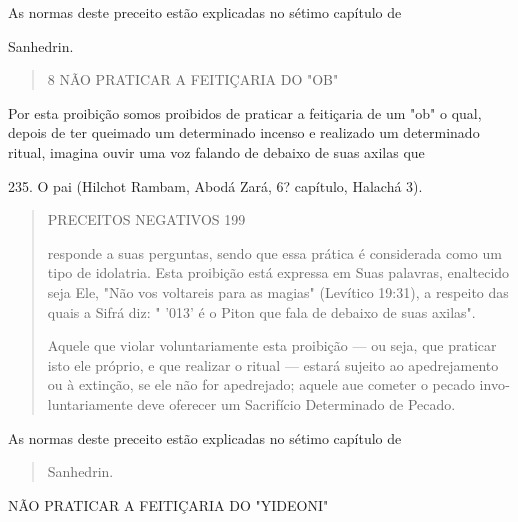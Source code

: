 As normas deste preceito estão explicadas no sétimo capítulo de

Sanhedrin.

\begin{quote}
8 NÃO PRATICAR A FEITIÇARIA DO "OB"
\end{quote}

Por esta proibição somos proibidos de praticar a feitiçaria de um "ob" o
qual, depois de ter queimado um determinado incenso e realizado um
deter­minado ritual, imagina ouvir uma voz falando de debaixo de suas
axilas que

235. O pai (Hilchot Rambam, Abodá Zará, 6? capítulo, Halachá 3).

\begin{quote}
PRECEITOS NEGATIVOS 199

responde a suas perguntas, sendo que essa prática é considerada como um
tipo de idolatria. Esta proibição está expressa em Suas palavras,
enaltecido seja Ele, "Não vos voltareis para as magias" (Levítico
19:31), a respeito das quais a Sifrá diz: " '013' é o Piton que fala de
debaixo de suas axilas".

Aquele que violar voluntariamente esta proibição --- ou seja, que
pra­ticar isto ele próprio, e que realizar o ritual --- estará sujeito
ao apedrejamento ou à extinção, se ele não for apedrejado; aquele aue
cometer o pecado invo­luntariamente deve oferecer um Sacrifício
Determinado de Pecado.
\end{quote}

As normas deste preceito estão explicadas no sétimo capítulo de

\begin{quote}
Sanhedrin.
\end{quote}

NÃO PRATICAR A FEITIÇARIA DO "YIDEONI"

